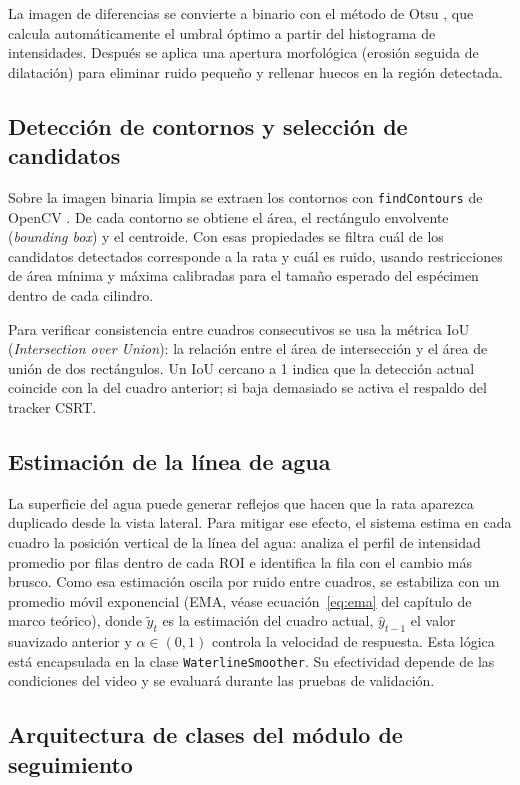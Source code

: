 La imagen de diferencias se convierte a binario con el método de Otsu \cite{otsu1979},
que calcula automáticamente el umbral óptimo a partir del histograma de intensidades.
Después se aplica una apertura morfológica (erosión seguida de dilatación) para
eliminar ruido pequeño y rellenar huecos en la región detectada.

\subsection{Detección de contornos y selección de candidatos}

Sobre la imagen binaria limpia se extraen los contornos con \texttt{findContours} de
OpenCV \cite{suzuki1985}. De cada contorno se obtiene el área, el rectángulo envolvente
(\textit{bounding box}) y el centroide. Con esas propiedades se filtra cuál de los
candidatos detectados corresponde a la rata y cuál es ruido, usando restricciones de
área mínima y máxima calibradas para el tamaño esperado del espécimen dentro de cada
cilindro.

Para verificar consistencia entre cuadros consecutivos se usa la métrica IoU
(\textit{Intersection over Union}): la relación entre el área de intersección y el
área de unión de dos rectángulos. Un IoU cercano a 1 indica que la detección actual
coincide con la del cuadro anterior; si baja demasiado se activa el respaldo del
tracker CSRT.

\subsection{Estimación de la línea de agua}

La superficie del agua puede generar reflejos que hacen que la rata aparezca
duplicado desde la vista lateral. Para mitigar ese efecto, el sistema estima en cada
cuadro la posición vertical de la línea del agua: analiza el perfil de intensidad
promedio por filas dentro de cada ROI e identifica la fila con el cambio más brusco.
Como esa estimación oscila por ruido entre cuadros, se estabiliza con un promedio
móvil exponencial (EMA, véase ecuación~\ref{eq:ema} del capítulo de marco teórico),
donde $\tilde{y}_t$ es la estimación del cuadro actual, $\hat{y}_{t-1}$ el valor
suavizado anterior y $\alpha \in (0,1)$ controla la velocidad de respuesta. Esta
lógica está encapsulada en la clase \texttt{WaterlineSmoother}. Su efectividad depende
de las condiciones del video y se evaluará durante las pruebas de validación.

\subsection{Arquitectura de clases del módulo de seguimiento}

